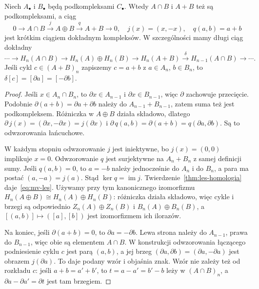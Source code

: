 \begin{twierdzenie}
\label{thm:mv-algebraiczny}
Niech $A_\bullet$ i $B_\bullet$ będą
podkompleksami $C_\bullet$. Wtedy
$A\cap B$ i $A+B$ też są podkompleksami,
a ciąg
\begin{equation}\label{eq:mv-ses}
 0\longrightarrow A\cap B
 \xrightarrow{\ j\ }A\oplus B
 \xrightarrow{\ q\ }A+B
 \longrightarrow0,
 \quad j(x)=(x,-x),\quad q(a,b)=a+b
\end{equation}
jest krótkim ciągiem dokładnym kompleksów.
W szczególności mamy długi ciąg dokładny
\begin{equation}\label{eq:mv-les}
 \cdots\to H_n(A\cap B)\to H_n(A)\oplus H_n(B)
 \to H_n(A+B)\xrightarrow{\delta}
 H_{n-1}(A\cap B)\to\cdots.
\end{equation}
Jeśli cykl $c\in(A+B)_n$ zapiszemy
$c=a+b$ z $a\in A_n$, $b\in B_n$,
to $\delta[c]=[\partial a]=[-\partial b]$.
\end{twierdzenie}
\begin{proof}
Jeśli $x\in A_n\cap B_n$, to
$\partial x\in A_{n-1}$ i $\partial x\in B_{n-1}$,
więc $\partial$ zachowuje przecięcie.
Podobnie $\partial(a+b)=\partial a+\partial b$ należy do
$A_{n-1}+B_{n-1}$, zatem suma
też jest podkompleksem.
Różniczka w $A\oplus B$ działa
składowo, dlatego
$\partial\,j(x)=(\partial x,-\partial x)=j(\partial x)$ i
$\partial\,q(a,b)=\partial(a+b)=q(\partial a,\partial b)$.
Są to odwzorowania łańcuchowe.

W każdym stopniu odwzorowanie $j$ jest
iniektywne, bo $j(x)=(0,0)$
implikuje $x=0$. Odwzorowanie $q$ jest
surjektywne na $A_n+B_n$ z samej
definicji sumy. Jeśli $q(a,b)=0$,
to $a=-b$ należy jednocześnie do
$A_n$ i do $B_n$, a para ma postać
$(a,-a)=j(a)$. Stąd
$\ker q=\operatorname{im}j$.
Twierdzenie~\ref{thm:les-homologia}
daje~\eqref{eq:mv-les}. Używamy przy tym kanonicznego izomorfizmu
$H_n(A\oplus B)\cong H_n(A)\oplus H_n(B)$:
różniczka działa składowo, więc cykle i brzegi są odpowiednio
$Z_n(A)\oplus Z_n(B)$ i $B_n(A)\oplus B_n(B)$,
a $[(a,b)]\mapsto([a],[b])$ jest izomorfizmem ich ilorazów.

Na koniec, jeśli $\partial(a+b)=0$, to
$\partial a=-\partial b$. Lewa strona należy do
$A_{n-1}$, prawa do $B_{n-1}$,
więc obie są elementem $A\cap B$.
W konstrukcji odwzorowania łączącego
podniesienie cyklu $c$ jest parą $(a,b)$,
a jej brzeg $(\partial a,\partial b)=(\partial a,-\partial a)$
jest obrazem $j(\partial a)$. To daje
podany wzór i objaśnia znak. Wzór nie zależy też od
rozkładu $c$: jeśli $a+b=a'+b'$, to
$t=a-a'=b'-b$ leży w $(A\cap B)_n$, a
$\partial a-\partial a'=\partial t$ jest tam brzegiem.
\end{proof}

